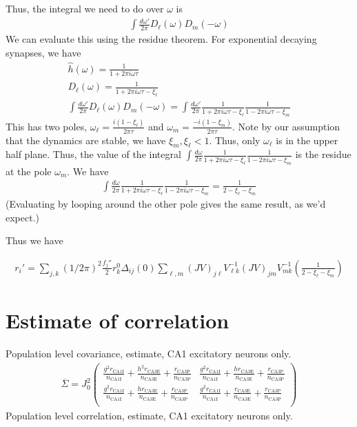 \documentclass [12pt]{amsart}
\theoremstyle{definition}
\newcommand{\inv}{^{-1}}
\begin{document}
Thus, the integral we need to do over $\omega$ is 
\begin{align*}
\int \frac{d\omega'}{2\pi} D_\ell(\omega)D_m(-\omega)
\end{align*}
We can evaluate this using the residue theorem. For exponential decaying synapses, we have 
\begin{align*}
\hat h (\omega) = \frac{1}{1 +2\pi i \omega \tau}\\
 D_\ell(\omega) = \frac{1}{1 + 2\pi i \omega \tau - \xi_\ell}\\
 \int \frac{d\omega'}{2\pi} D_\ell(\omega)D_m(-\omega)
= 
 \int \frac{d\omega'}{2\pi} \frac{1}{1 + 2\pi i \omega \tau - \xi_\ell} \frac{1}{1 - 2\pi i \omega \tau - \xi_m}
\end{align*}
This has two poles, 
$\omega_\ell = \frac{i (1 - \xi_\ell)}{2\pi \tau}$ and $\omega_m = \frac{-i (1 - \xi_m)}{2\pi \tau}$. Note by our assumption that the dynamics are stable, we have $\xi_m, \xi_\ell < 1$. Thus, only $\omega_\ell$ is in the upper half plane. Thus, the value of the integral $\int \frac{d\omega}{2\pi} \frac{1}{1 + 2\pi i \omega \tau - \xi_\ell} \frac{1}{1 - 2\pi i \omega \tau - \xi_m}$ is the residue at the pole $\omega_m$. We have
\begin{align*}
\int \frac{d\omega}{2\pi} \frac{1}{1 + 2\pi i \omega \tau - \xi_\ell} \frac{1}{1 - 2\pi i \omega \tau - \xi_m} = \frac{1}{2 - \xi_\ell - \xi_m}
\end{align*}
(Evaluating by looping around the other pole gives the same result, as we'd expect.) 

Thus we have 

\begin{align*}
r_i' = \sum_{j, k} (1/2\pi)^2 \frac{f_j''}{2} r_k^0 \hat \Delta_{ij}(0) \sum_{\ell, m} (JV)_{j\ell} V_{\ell k}\inv(JV)_{jm} V\inv_{mk} \left(\frac 1 { 2  - \xi_\ell - \xi_m}\right)
\end{align*}

\section{Estimate of correlation}
Population level covariance, estimate, CA1 excitatory neurons only. 
\begin{align*}
 \overline{\Sigma} = J_0 ^2 \begin{pmatrix}
\frac{g^2 r_{\text{CA1I}}}{n_{\text{CA1I}}}+\frac{h^2 r_{\text{CA3E}}}{n_{\text{CA3E}}}+\frac{r_{\text{CA3P}}}{n_{\text{CA3P}}}&
\frac{g^2 r_{\text{CA1I}}}{n_{\text{CA1I}}}+\frac{h r_{\text{CA3E}}}{n_{\text{CA3E}}}+\frac{r_{\text{CA3P}}}{n_{\text{CA3P}}}\\
\frac{g^2 r_{\text{CA1I}}}{n_{\text{CA1I}}}+\frac{h r_{\text{CA3E}}}{n_{\text{CA3E}}}+\frac{r_{\text{CA3P}}}{n_{\text{CA3P}}}&
\frac{g^2 r_{\text{CA1I}}}{n_{\text{CA1I}}}+\frac{r_{\text{CA3E}}}{n_{\text{CA3E}}}+\frac{r_{\text{CA3P}}}{n_{\text{CA3P}}}\\
\end{pmatrix}
\end{align*}
Population level correlation, estimate, CA1 excitatory neurons only. 
\end{document}
